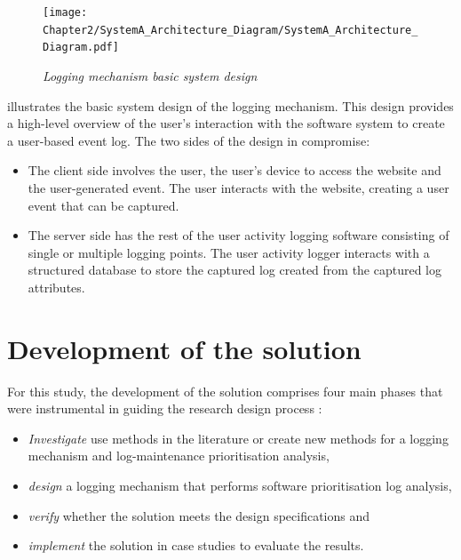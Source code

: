  \clearpage

 \begin{figure}[!htb]
	 \centering %
	 \texttt{[image: Chapter2/SystemA\_Architecture\_Diagram/SystemA\_Architecture\_Diagram.pdf]}
	 \caption[Logging mechanism basic system design]
	 {\textit{Logging mechanism basic system design}}\label{fig:ch2_systemDesign}
 \end{figure}
 
 illustrates the basic system design of the logging mechanism. This design provides a high-level overview of the user's interaction with the software system to create a user-based event log. The two sides of the design in  compromise:
 
 \begin{itemize}
	 \item The client side involves the user, the user's device to access the website and the user-generated event. The user interacts with the website, creating a user event that can be captured. 
	 \item The server side has the rest of the user activity logging software consisting of single or multiple logging points. The user activity logger interacts with a structured database to store the captured log created from the captured log attributes.
 \end{itemize}

 \clearpage

\section{Development of the solution}\label{sec:ch2_developementOfSolution}
For this study, the development of the solution comprises four main phases that were instrumental in guiding the research design process \cite{Stadtlander2009}:

\begin{itemize}
	\item \textit{Investigate} use methods in the literature or create new methods for a logging mechanism and log-maintenance prioritisation analysis,
	\item \textit{design} a logging mechanism that performs software prioritisation log analysis,
	\item \textit{verify} whether the solution meets the design specifications and
	\item \textit{implement} the solution in case studies to evaluate the results.
\end{itemize}

